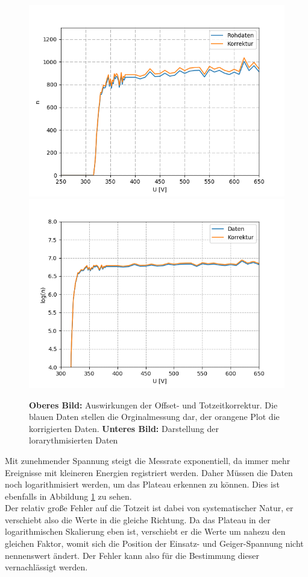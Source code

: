 \documentclass[12pt,a4paper]{article}
\begin{document}
\begin{figure}
\centering
\includegraphics[scale=0.9]{Bilder/GMTotzeit.PNG}
\includegraphics[scale=0.9]{Bilder/GMlogroh.PNG}
\caption{\textbf{Oberes Bild:} Auswirkungen der Offset- und Totzeitkorrektur. Die blauen Daten stellen die Orginalmessung dar, der orangene Plot die korrigierten Daten. \textbf{Unteres Bild:} Darstellung der lorarythmisierten Daten}
\label{fig:GMTotzeit}
\end{figure}

Mit zunehmender Spannung steigt die Messrate exponentiell, da immer mehr Ereignisse mit kleineren Energien registriert werden. Daher Müssen die Daten noch logarithmisiert werden, um das Plateau erkennen zu können. Dies ist ebenfalls in Abbildung \ref{fig:GMTotzeit} zu sehen.\\
Der relativ große Fehler auf die Totzeit ist dabei von systematischer Natur, er verschiebt also die Werte in die gleiche Richtung. Da das Plateau in der logarithmischen Skalierung eben ist, verschiebt er die Werte um nahezu den gleichen Faktor, womit sich die Position der Einsatz- und Geiger-Spannung nicht nennenswert ändert. Der Fehler kann also für die Bestimmung dieser vernachlässigt werden.
\end{document}
